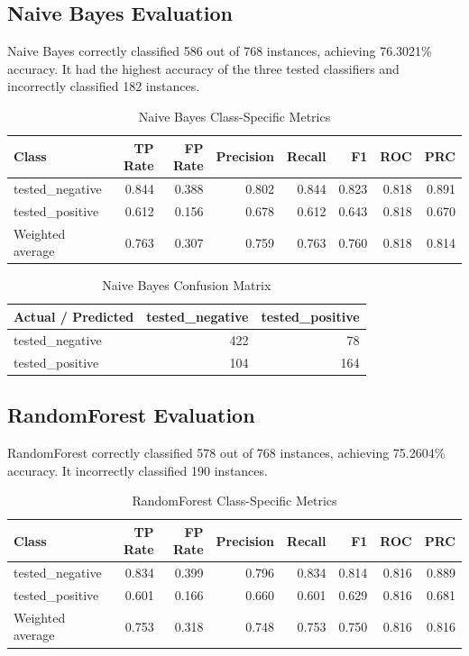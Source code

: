 \documentclass[11pt,a4paper]{article}
\begin{document}
\subsection{Naive Bayes Evaluation}
Naive Bayes correctly classified 586 out of 768 instances, achieving 76.3021\% accuracy. It had the highest accuracy of the three tested classifiers and incorrectly classified 182 instances.

\begin{table}[H]
\centering
\small
\caption{Naive Bayes Class-Specific Metrics}
\label{tab:nbmetrics}
\begin{tabular}{lrrrrrrr}
\toprule
\textbf{Class} & \textbf{TP Rate} & \textbf{FP Rate} & \textbf{Precision} & \textbf{Recall} & \textbf{F1} & \textbf{ROC} & \textbf{PRC} \\
\midrule
tested\_negative & 0.844 & 0.388 & 0.802 & 0.844 & 0.823 & 0.818 & 0.891 \\
tested\_positive & 0.612 & 0.156 & 0.678 & 0.612 & 0.643 & 0.818 & 0.670 \\
\midrule
Weighted average & 0.763 & 0.307 & 0.759 & 0.763 & 0.760 & 0.818 & 0.814 \\
\bottomrule
\end{tabular}
\end{table}

\begin{table}[H]
\centering
\small
\caption{Naive Bayes Confusion Matrix}
\label{tab:nbcm}
\begin{tabular}{lrr}
\toprule
\textbf{Actual / Predicted} & \textbf{tested\_negative} & \textbf{tested\_positive} \\
\midrule
tested\_negative & 422 & 78 \\
tested\_positive & 104 & 164 \\
\bottomrule
\end{tabular}
\end{table}

\subsection{RandomForest Evaluation}
RandomForest correctly classified 578 out of 768 instances, achieving 75.2604\% accuracy. It incorrectly classified 190 instances.

\begin{table}[H]
\centering
\small
\caption{RandomForest Class-Specific Metrics}
\label{tab:rfmetrics}
\begin{tabular}{lrrrrrrr}
\toprule
\textbf{Class} & \textbf{TP Rate} & \textbf{FP Rate} & \textbf{Precision} & \textbf{Recall} & \textbf{F1} & \textbf{ROC} & \textbf{PRC} \\
\midrule
tested\_negative & 0.834 & 0.399 & 0.796 & 0.834 & 0.814 & 0.816 & 0.889 \\
tested\_positive & 0.601 & 0.166 & 0.660 & 0.601 & 0.629 & 0.816 & 0.681 \\
\midrule
Weighted average & 0.753 & 0.318 & 0.748 & 0.753 & 0.750 & 0.816 & 0.816 \\
\bottomrule
\end{tabular}
\end{table}
\end{document}
